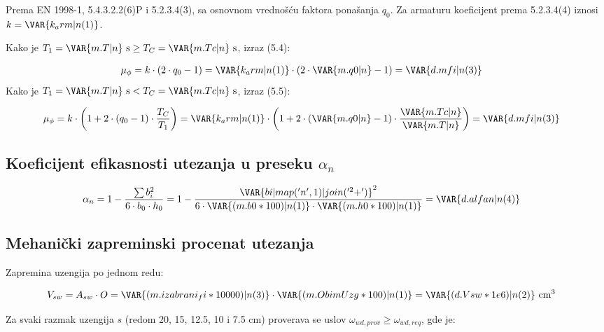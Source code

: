 Prema EN 1998-1, 5.4.3.2.2(6)P i 5.2.3.4(3), sa osnovnom vrednošću faktora ponašanja $q_0$.
Za armaturu  koeficijent prema 5.2.3.4(4) iznosi $k = \VAR{k_arm|n(1)}$.

Kako je $T_1 = \VAR{m.T|n} \ \mathrm{s} \geq T_C = \VAR{m.Tc|n} \ \mathrm{s}$, izraz (5.4):

\begin{align*}
\mu_\phi &= k \cdot (2 \cdot q_0 - 1) = \VAR{k_arm|n(1)} \cdot (2 \cdot \VAR{m.q0|n} - 1) = \VAR{d.mfi|n(3)}
\end{align*}
Kako je $T_1 = \VAR{m.T|n} \ \mathrm{s} < T_C = \VAR{m.Tc|n} \ \mathrm{s}$, izraz (5.5):

\begin{align*}
\mu_\phi &= k \cdot \left( 1 + 2 \cdot (q_0 - 1) \cdot \frac{T_C}{T_1} \right) = \VAR{k_arm|n(1)} \cdot \left( 1 + 2 \cdot (\VAR{m.q0|n} - 1) \cdot \frac{\VAR{m.Tc|n}}{\VAR{m.T|n}} \right) = \VAR{d.mfi|n(3)}
\end{align*}

\subsection{Koeficijent efikasnosti utezanja u preseku $\alpha_n$}

\begin{align*}
\alpha_n &= 1 - \frac{\sum b_i^2}{6 \cdot b_0 \cdot h_0} = 1 - \frac{\VAR{bi|map('n', 1)|join('^2 + ')}^2}{6 \cdot \VAR{(m.b0*100)|n(1)} \cdot \VAR{(m.h0*100)|n(1)}} = \VAR{d.alfan|n(4)}
\end{align*}

\subsection{Mehanički zapreminski procenat utezanja}

Zapremina uzengija po jednom redu:

\begin{align*}
V_{sw} &= A_{sw} \cdot O = \VAR{(m.izabrani_fi*10000)|n(3)} \cdot \VAR{(m.ObimUzg*100)|n(1)} = \VAR{(d.Vsw*1e6)|n(2)} \ \mathrm{cm^3}
\end{align*}

Za svaki razmak uzengija $s$ (redom 20, 15, 12.5, 10 i 7.5 cm) proverava se uslov $\omega_{wd,prov} \geq \omega_{wd,req}$, gde je:

